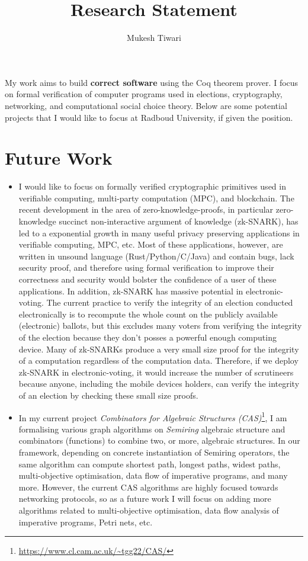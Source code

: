 \documentclass[a4paper]{article}
\title{Research Statement}
\author{Mukesh Tiwari}
\date{}
\begin{document}
\fontsize{11}{15}
\selectfont
\maketitle

My work aims to build \textbf{correct software} 
using the Coq theorem prover. 
I focus on formal verification of computer programs used in elections, cryptography, 
networking, and computational social choice theory. Below are some potential projects 
that I would like to focus at Radboud University, if given the position.


\section{Future Work}
\begin{itemize}
\item I would like to focus 
	on formally verified cryptographic primitives used in
	verifiable computing, multi-party computation (MPC), and blockchain.
	The recent development in the 
	area of zero-knowledge-proofs, in particular 
	zero-knowledge succinct non-interactive argument of knowledge (zk-SNARK), 
	has led to a exponential growth in many useful 
	privacy preserving applications in verifiable computing, MPC, etc. Most of these 
	applications, however, are written 
	in unsound language (Rust/Python/C/Java) and contain bugs,
	lack security proof, and therefore using formal verification 
	to improve their correctness and security would bolster the 
	confidence of a user of these applications.
	In addition, zk-SNARK has massive potential in electronic-voting. The current 
	practice to verify the integrity of an election conducted electronically is to 
	recompute the whole count on the publicly available (electronic) ballots, but 
	this excludes many voters from verifying the integrity of the election because 
	they don't posses a powerful enough computing device. Many of 
	zk-SNARKs produce a very small size proof for the integrity of a computation 
	regardless of the computation data. Therefore, if we deploy zk-SNARK in 
	electronic-voting, it would 
	increase the number of scrutineers because anyone, including the 
	mobile devices holders, can verify the integrity of an election 
	by checking these small size proofs. 

\item In my current project \emph{Combinators for Algebraic 
	Structures (CAS)}\footnote{\url{https://www.cl.cam.ac.uk/~tgg22/CAS/}}, 
	I am formalising various graph algorithms on \emph{Semiring} algebraic 
	structure and combinators (functions) to combine two, or more, algebraic structures.
	In our framework, depending on concrete instantiation of Semiring operators,
	the same algorithm can compute shortest path, longest paths, widest paths, 
	multi-objective optimisation, data flow of imperative programs, and many more.
	However, the current CAS algorithms are highly focused towards networking 
	protocols, so as a future work I will focus on adding more algorithms 
	related to multi-objective optimisation, data flow analysis of
	imperative programs, Petri nets, etc. 


\end{itemize}
\end{document}
